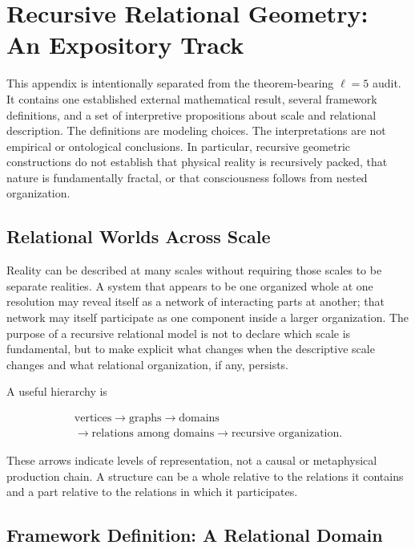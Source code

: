 \chapter[Recursive Relational Geometry]{Recursive Relational Geometry: An Expository Track}

\begin{remark}
This appendix is intentionally separated from the theorem-bearing $\ell=5$ audit. It contains one established external mathematical result, several framework definitions, and a set of interpretive propositions about scale and relational description. The definitions are modeling choices. The interpretations are not empirical or ontological conclusions. In particular, recursive geometric constructions do not establish that physical reality is recursively packed, that nature is fundamentally fractal, or that consciousness follows from nested organization.
\end{remark}

\section{Relational Worlds Across Scale}

Reality can be described at many scales without requiring those scales to be separate realities. A system that appears to be one organized whole at one resolution may reveal itself as a network of interacting parts at another; that network may itself participate as one component inside a larger organization. The purpose of a recursive relational model is not to declare which scale is fundamental, but to make explicit what changes when the descriptive scale changes and what relational organization, if any, persists.

A useful hierarchy is

\[
\begin{gathered}
\text{vertices}
\longrightarrow
\text{graphs}
\longrightarrow
\text{domains}\\
\longrightarrow
\text{relations among domains}
\longrightarrow
\text{recursive organization}.
\end{gathered}
\]

These arrows indicate levels of representation, not a causal or metaphysical production chain. A structure can be a whole relative to the relations it contains and a part relative to the relations in which it participates.

\section{Framework Definition: A Relational Domain}


